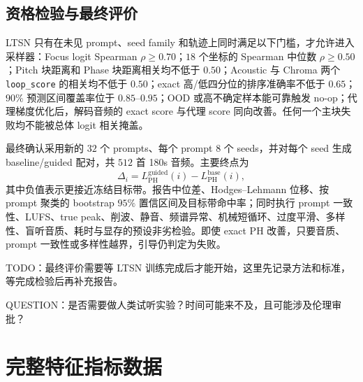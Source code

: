 \documentclass{article}
\begin{document}
\subsection{资格检验与最终评价}

LTSN 只有在未见 prompt、seed family 和轨迹上同时满足以下门槛，才允许进入采样器：Focus logit Spearman $\rho\geq0.70$；$18$ 个坐标的 Spearman 中位数 $\rho\geq0.50$；Pitch 块距离和 Phase 块距离相关均不低于 $0.50$；Acoustic 与 Chroma 两个 \texttt{loop\_score} 的相关均不低于 $0.50$；exact 高/低四分位的排序准确率不低于 $0.65$；$90\%$ 预测区间覆盖率位于 $0.85$--$0.95$；OOD 或高不确定样本能可靠触发 no-op；代理梯度优化后，解码音频的 exact score 与代理 score 同向改善。任何一个主块失败均不能被总体 logit 相关掩盖。

最终确认采用新的 $32$ 个 prompts、每个 prompt $8$ 个 seeds，并对每个 seed 生成 baseline/guided 配对，共 $512$ 首 180s 音频。主要终点为
\begin{equation}
\Delta_i=L_{\mathrm{PH}}^{\mathrm{guided}}(i)
-L_{\mathrm{PH}}^{\mathrm{base}}(i),
\end{equation}
其中负值表示更接近冻结目标带。报告中位差、Hodges--Lehmann 位移、按 prompt 聚类的 bootstrap $95\%$ 置信区间及目标带命中率；同时执行 prompt 一致性、LUFS、true peak、削波、静音、频谱异常、机械短循环、过度平滑、多样性、盲听音质、耗时与显存的预设非劣检验。即使 exact PH 改善，只要音质、prompt 一致性或多样性越界，引导仍判定为失败。

\begin{tcolorbox}[colback=yellow!30,colframe=yellow!60,boxrule=0.5pt,arc=6pt,left=6pt,right=6pt,top=4pt,bottom=4pt]
TODO：最终评价需要等 LTSN 训练完成后才能开始，这里先记录方法和标准，等完成检验后再补充报告。
\end{tcolorbox}

\begin{tcolorbox}[colback=yellow!30,colframe=yellow!60,boxrule=0.5pt,arc=6pt,left=6pt,right=6pt,top=4pt,bottom=4pt]
QUESTION：是否需要做人类试听实验？时间可能来不及，且可能涉及伦理审批？
\end{tcolorbox}
\fi

\clearpage




\clearpage
\appendix

\section{完整特征指标数据}
\label{sec:appendix_topology_tables}
\end{document}
